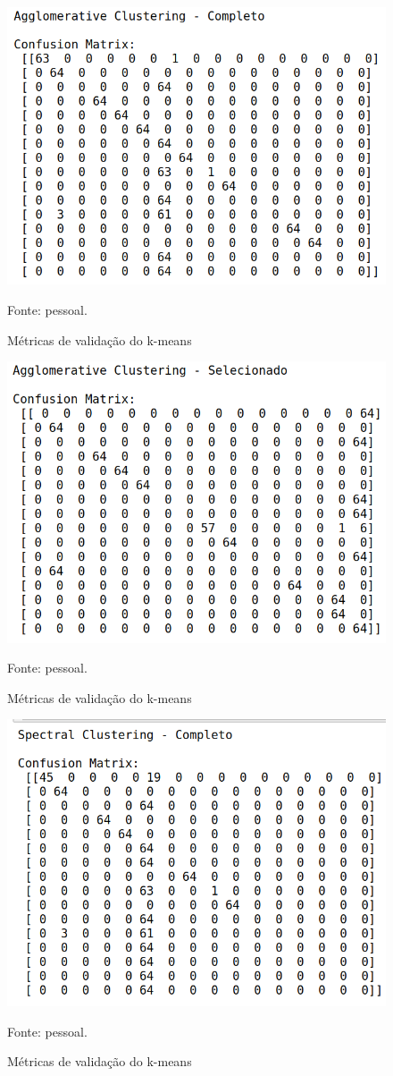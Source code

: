 \begin{figure}[h]
	\centering
	\includegraphics[width=0.7\linewidth]{images/resultsAglomerativeCompleto}
	\caption{Métricas de validação do k-means}
	Fonte: pessoal.
	\label{fig:resultAglomerativeCompleto}
\end{figure}

\begin{figure}[h]
	\centering
	\includegraphics[width=0.7\linewidth]{images/resultsAglomerativeSelecionado}
	\caption{Métricas de validação do k-means}
	Fonte: pessoal.
	\label{fig:resultAglometariveSelecionado}
\end{figure}

\begin{figure}[h]
	\centering
	\includegraphics[width=0.7\linewidth]{images/resultSpectralCompleto}
	\caption{Métricas de validação do k-means}
	Fonte: pessoal.
	\label{fig:resultSpectralCompleto}
\end{figure}

